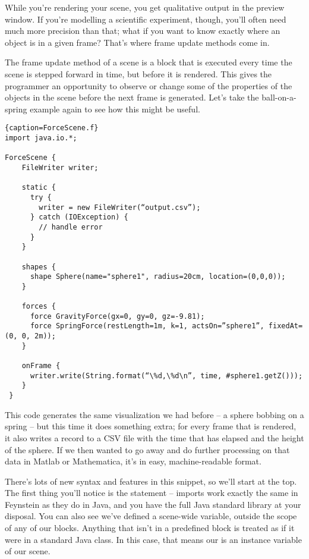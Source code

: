 While you're rendering your scene, you get qualitative output in the
preview window. If you're modelling a scientific experiment, though,
you'll often need much more precision than that; what if you want to
know exactly where an object is in a given frame? That's where frame
update methods come in.

The frame update method of a scene is a block that is executed every
time the scene is stepped forward in time, but before it is
rendered. This gives the programmer an opportunity to observe or
change some of the properties of the objects in the scene before the
next frame is generated. Let's take the ball-on-a-spring example again
to see how this might be useful.

\begin{lstlisting}{caption=ForceScene.f}
import java.io.*;

ForceScene {
    FileWriter writer;

    static {
      try {
        writer = new FileWriter(“output.csv”);
      } catch (IOException) {
        // handle error
      }
    }

    shapes {
      shape Sphere(name="sphere1", radius=20cm, location=(0,0,0));
    }

    forces {
      force GravityForce(gx=0, gy=0, gz=-9.81);
      force SpringForce(restLength=1m, k=1, actsOn=”sphere1”, fixedAt=(0, 0, 2m));
    }

    onFrame {
      writer.write(String.format(“\%d,\%d\n”, time, #sphere1.getZ()));
    }
 }
\end{lstlisting}

This code generates the same visualization we had before -- a sphere
bobbing on a spring -- but this time it does something extra; for
every frame that is rendered, it also writes a record to a CSV file
with the time that has elapsed and the height of the sphere. If we
then wanted to go away and do further processing on that data in
Matlab or Mathematica, it's in easy, machine-readable format.

There's lots of new syntax and features in this snippet, so we'll
start at the top. The first thing you'll notice is the 
statement -- imports work exactly the same in Feynstein as they do in
Java, and you have the full Java standard library at your
disposal. You can also see we've defined a scene-wide variable,
outside the scope of any of our blocks. Anything that isn't in a
predefined block is treated as if it were in a standard Java class. In
this case, that means our  is an instance variable of our
scene.

